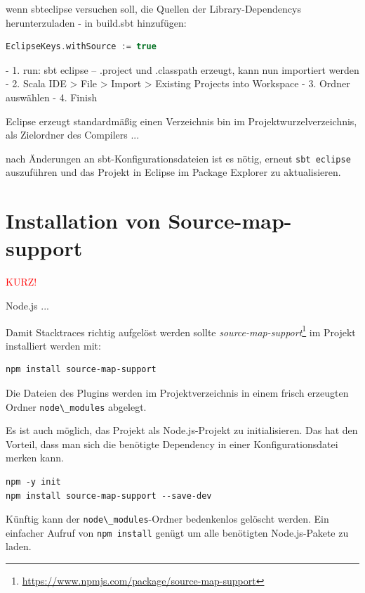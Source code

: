 \documentclass[a4paper, 12pt, hidelinks, listof=totoc, listoftables=totoc, bibliography=totoc]{scrreprt}
\newcommand{\code}[1]{\lstinline[language=Scala, style=inline]|#1|}
\newcommand{\TODO}[1]{\textcolor{red}{#1}\newline}
\begin{document}
wenn sbteclipse versuchen soll, die Quellen der Library-Dependencys herunterzuladen - in build.sbt hinzufügen:

\begin{lstlisting}[language=Scala, style=snippet]
EclipseKeys.withSource := true
\end{lstlisting}



- 1. run:
  sbt eclipse  --  .project und .classpath erzeugt, kann nun importiert werden
- 2. Scala IDE > File > Import > Existing Projects into Workspace
- 3. Ordner auswählen
- 4. Finish


Eclipse erzeugt standardmäßig einen Verzeichnis bin im Projektwurzelverzeichnis, als Zielordner des Compilers ...

nach Änderungen an sbt-Konfigurationsdateien ist es nötig, erneut \code{sbt eclipse} auszuführen und das Projekt in Eclipse im Package Explorer zu aktualisieren.






\section{Installation von Source-map-support}

\TODO{KURZ!}

Node.js ...

Damit Stacktraces richtig aufgelöst werden sollte \emph{source-map-support}\footnote{\url{https://www.npmjs.com/package/source-map-support}} im Projekt installiert werden mit:

\begin{lstlisting}[style=snippet]
npm install source-map-support
\end{lstlisting}

Die Dateien des Plugins werden im Projektverzeichnis in einem frisch erzeugten Ordner \code{node\_modules} abgelegt.

Es ist auch möglich, das Projekt als Node.js-Projekt zu initialisieren. Das hat den Vorteil, dass man sich die benötigte Dependency in einer Konfigurationsdatei merken kann.

\begin{lstlisting}[style=snippet]
npm -y init
npm install source-map-support --save-dev
\end{lstlisting}

Künftig kann der \code{node\_modules}-Ordner bedenkenlos gelöscht werden. Ein einfacher Aufruf von \code{npm install} genügt um alle benötigten Node.js-Pakete zu laden.
\end{document}
